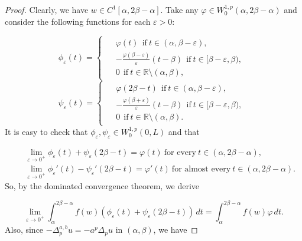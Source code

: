 \documentclass[10pt,a4paper]{amsart}
\begin{document}
\begin{proof} Clearly, we have $w \in C^1[\alpha, 2 \beta - \alpha]$. Take any $\varphi \in W^{1,p}_{0}(\alpha, 2\beta - \alpha)$ and consider the following functions for each $\varepsilon > 0$:

\begin{equation*}
\phi_{\varepsilon}(t) =
\begin{cases}
\begin{aligned}
     & \varphi(t) \ \ \text{if} \ t \in (\alpha, \beta - \varepsilon), \\
     & -\frac{\varphi(\beta - \varepsilon)}{\varepsilon}(t - \beta) \ \ \text{if} \ t \in [\beta - \varepsilon, \beta), \\
     & 0 \ \ \text{if} \ t \in \mathbb{R} \setminus (\alpha, \beta),
\end{aligned}
\end{cases}
\end{equation*}
\begin{equation*}
\psi_{\varepsilon}(t) =
\begin{cases}
\begin{aligned}
     & \varphi(2\beta - t) \ \ \text{if} \ t \in (\alpha, \beta - \varepsilon), \\
     & -\frac{\varphi(\beta + \varepsilon)}{\varepsilon}(t-\beta) \ \ \text{if} \ t \in [\beta - \varepsilon, \beta), \\
     & 0 \ \ \text{if} \ t \in \mathbb{R} \setminus (\alpha, \beta).
\end{aligned}
\end{cases}
\end{equation*}
It is easy to check that $\phi_{\varepsilon},\psi_{\varepsilon} \in W^{1,p}_0(0,L)$ and that

\begin{eqnarray*}
&& \lim_{\varepsilon \to 0^{+}} \phi_{\varepsilon}(t) + \psi_{\varepsilon}(2\beta - t) = \varphi(t) \ \text{for every} \ t \in (\alpha, 2\beta - \alpha),\\
&& \lim_{\varepsilon \to 0^{+}} \phi_{\varepsilon}'(t) - \psi_{\varepsilon}'(2\beta - t) = \varphi'(t) \ \text{for almost every} \ t \in (\alpha, 2\beta - \alpha).
\end{eqnarray*}
So, by the dominated convergence theorem, we derive

\begin{equation}\label{limu+1}
\lim_{\varepsilon \to 0^{+}} \int_{\alpha}^{2\beta - \alpha}f(w)\left(\phi_{\varepsilon}(t) + \psi_{\varepsilon}(2\beta - t)\right)\, dt = \int_{\alpha}^{2\beta - \alpha}f(w)\varphi \, dt.
\end{equation}
Also, since $-\Delta_{p}^{a,b}u = -a^{p}\Delta_{p}u$ in $(\alpha,\beta)$, we have


\end{proof}
\end{document}
